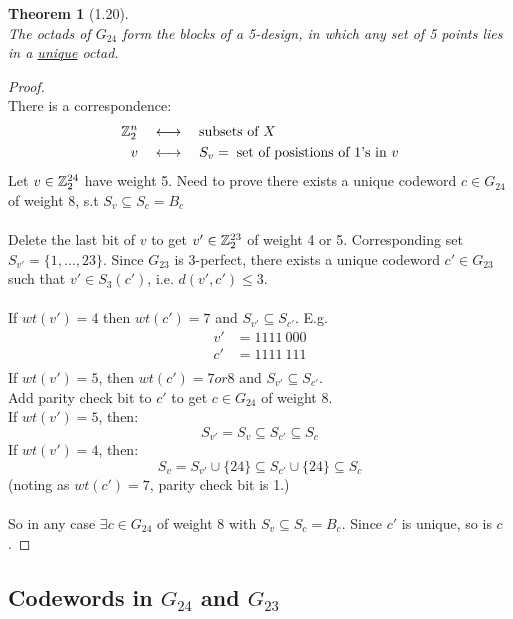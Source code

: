\documentclass[]{article}
\newtheorem{thm}{Theorem}[section]
\theoremstyle{definition}
\theoremstyle{remark}
\numberwithin{equation}{section}
\begin{document}
		\begin{thm}[1.20] \hfill \\
			The octads of $G_{24}$ form the blocks of a 5-design, in which any set of 5 points lies in a \underline{\emph{unique}} octad.
		\end{thm}
		\begin{proof} \hfill \\
			There is a correspondence: \\
			\begin{align*}
				\mathbb{Z}_2^n \quad &\longleftrightarrow\quad \text{subsets of $X$}\\
				v \quad & \longleftrightarrow \quad S_v =\; \text{set of posistions of 1's in $v$}
			\end{align*}
			Let $v \in \mathbb{Z}_2^{24}$ have weight 5. Need to prove there exists a unique codeword $c \in G_{24}$ of weight 8, s.t $S_v \subseteq S_c = B_c$\\
			\\

			Delete the last bit of $v$ to get $v' \in \mathbb{Z}_2^{23}$ of weight 4 or 5. Corresponding set $S_{v'} = \{1,...,23\}$. Since $G_{23}$ is 3-perfect, there exists a unique codeword $c' \in G_{23}$  such that $v' \in S_3(c')$, i.e. $d(v',c') \leq 3$.\\
			\\
			If $wt(v') = 4$ then $wt(c') = 7$ and $S_{v'} \subseteq S_{c'}$. E.g.\\
			\begin{align*}
				v' &= 1111\ 000\\
				c' &= 1111\ 111\\
			\end{align*}
			If $wt(v') = 5$, then $wt(c') = 7 or 8$ and $S_{v'} \subseteq S_{c'}$.\\
			Add parity check bit to $c'$ to get $c \in G_{24}$ of weight 8.
			\\
			If $wt(v') = 5$, then:
				\[
					S_{v'} = S_v  \subseteq S_{c'} \subseteq S_c
				\]
			If $wt(v') = 4$, then:
				\[
					S_v = S_{v'} \cup \{24\}  \subseteq S_{c'} \cup \{24\} \subseteq S_c
				\]
			(noting as $wt(c') = 7$, parity check bit is 1.)\\
			\\
			So in any case $\exists c \in G_{24}$ of weight 8 with $S_v \subseteq S_c = B_c$.
			Since $c'$ is unique, so is $c$.
		\end{proof}
	\subsection{Codewords in \texorpdfstring{$G_{24}$}{G24} and \texorpdfstring{$G_{23}$}{G23}}
\end{document}
